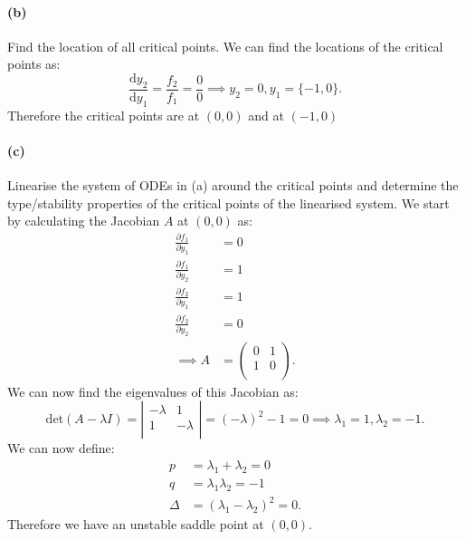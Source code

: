 \paragraph{(b)} Find the location of all critical points.
\bigbreak
We can find the locations of the critical points as:
\[ 
  \frac{\mathrm{d}y_2}{\mathrm{d}y_1} = \frac{f_2}{f_1} = \frac{0}{0} \implies y_2 = 0, y_1 = \{-1,0\} 
.\]
Therefore the critical points are at $\left( 0,0 \right) $ and at $\left( -1,0 \right) $


\paragraph{(c)} Linearise the system of ODEs in (a) around the critical points and determine the type/stability properties of the critical points of the linearised system.
\bigbreak
We start by calculating the Jacobian $A$ at $(0,0)$ as:
\begin{align*}
  \frac{\partial f_1}{\partial y_1} &= 0 \\
  \frac{\partial f_1}{\partial y_2} &= 1 \\
  \frac{\partial f_2}{\partial y_1} &= 1 \\
  \frac{\partial f_2}{\partial y_2} &= 0 \\
  \implies A &= \begin{pmatrix}
  0 & 1\\
  1 & 0\\
  \end{pmatrix}
.\end{align*}
We can now find the eigenvalues of this Jacobian as:
\[ 
\mathrm{det}(A - \lambda I) = \left| \begin{array}{cc}
-\lambda & 1\\
1 & -\lambda\\
\end{array} \right| = \left( -\lambda \right)^2 - 1 = 0 \implies \lambda_1 = 1, \lambda_2 = -1
.\]
We can now define:
\begin{align*}
  p &= \lambda_1 + \lambda_2 = 0\\
  q &= \lambda_1 \lambda_2 = -1 \\
  \Delta &= \left( \lambda_1 - \lambda_2 \right)^2 = 0
.\end{align*}
Therefore we have an unstable saddle point at $(0,0)$.

